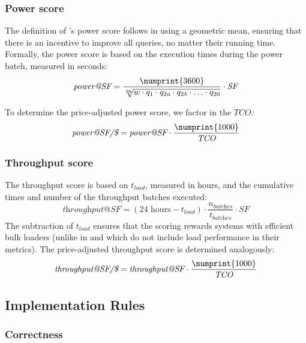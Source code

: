 \subsubsection{Power score}
\label{sec:power-score}

The definition of \snbbi's power score follows \tpcH in using a geometric mean, ensuring that there is an incentive to improve all queries, no matter their running time.
Formally, the power score is based on the execution times during the power batch, measured in seconds:
$$
\textit{power@SF} =
    \frac{\numprint{3600}}{\sqrt[28]{
        w \cdot q_{1} \cdot q_{2\variant{a}} \cdot q_{2\variant{b}} \cdot \ldots \cdot q_{20}}
    }
    \cdot
    \textit{SF}
$$

To determine the price-adjusted power score, we factor in the $\textit{TCO}$\emph{:}
$$ \textit{power@SF/\$} = \textit{power@SF} \cdot \frac{\numprint{1000}}{\textit{TCO}} $$

\subsubsection{Throughput score}
\label{sec:throughput-score}

The throughput score is based on $t_\textit{load}$, measured in hours,
and the cumulative times and number of the throughput batches executed:
$$
\textit{throughput@SF} =
    (24\text{ hours} - t_\textit{load})
    \cdot
    \frac{n_\textit{batches}}{t_\textit{batches}}
    \cdot
    \textit{SF}
$$
The subtraction of $t_\textit{load}$ ensures that the scoring rewards systems with efficient bulk loaders (unlike in \tpcH and \tpcDS which do not include load performance in their metrics).
The price-adjusted throughput score is determined analogously: %
$$ \textit{throughput@SF/\$} = \textit{throughput@SF} \cdot \frac{\numprint{1000}}{\textit{TCO}} $$

\subsection{Implementation Rules}
\label{sec:bi-implementation-rules}

\subsubsection{Correctness}
\label{sec:bi-correcntess}

